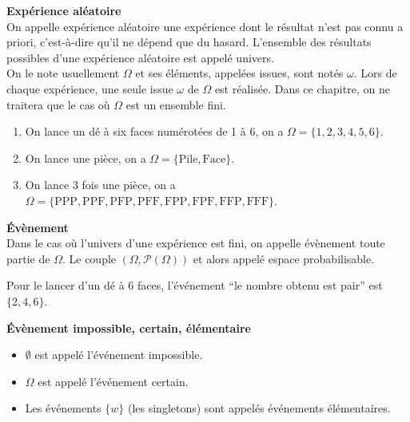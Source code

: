 \documentclass[../PolyS4.tex]{subfiles}
\begin{document}
\begin{Def}\textbf{Expérience aléatoire}\\

On appelle expérience aléatoire une expérience dont le résultat n'est pas connu a priori, c'est-à-dire qu'il ne dépend que du hasard. L'ensemble des résultats possibles d'une expérience aléatoire est appelé univers.\\
 On le note usuellement $\Omega$ et ses éléments, appelées issues, sont notés $\omega$. Lors de chaque expérience, une seule issue $\omega$ de $\Omega$ est réalisée. Dans ce chapitre, on ne traitera que le cas où $\Omega$ est un ensemble fini.\\
\end{Def}

\begin{Ex}
\begin{enumerate}
    \item On lance un dé à six faces numérotées de 1 à 6, on a $\Omega = \{1, 2, 3, 4, 5, 6\}$.
    \item On lance une pièce, on a $\Omega = \{\text{Pile}, \text{Face}\}$.
    \item On lance 3 fois une pièce, on a 
    $\Omega = \{\text{PPP}, \text{PPF}, \text{PFP}, \text{PFF}, \text{FPP}, \text{FPF}, \text{FFP}, \text{FFF}\}$.
\end{enumerate}
\end{Ex}


\begin{Def}\textbf{Évènement}\\

Dans le cas où l'univers d'une expérience est fini, on appelle évènement toute partie de $\Omega$. Le couple $(\Omega, \mathcal{P}(\Omega))$ et alors appelé espace probabilisable.\\

\end{Def}


\begin{Ex}
Pour le lancer d'un dé à 6 faces, l'événement “le nombre obtenu est pair” est $\{2, 4, 6\}$.
\end{Ex}

\begin{Def}\textbf{Évènement impossible, certain, élémentaire}\\
\begin{itemize}
    \item $\emptyset$ est appelé l'événement impossible.
    \item $\Omega$ est appelé l'événement certain.
    \item  Les événements $\{w\}$ (les singletons) sont appelés événements élémentaires.\\
\end{itemize}

\end{Def}
\end{document}
